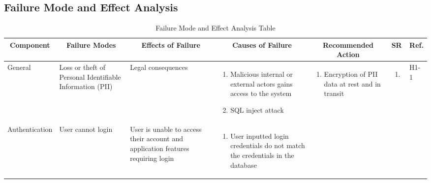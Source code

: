 \documentclass{article}
\begin{document}
\newpage
\begin{landscape}
	\section{Failure Mode and Effect Analysis}
	\begin{longtable}{|p{}|p{}|p{}|p{}|p{}|p{}|p{}|}
		\caption{Failure Mode and Effect Analysis Table}                                                     \\
		\hline
		\multicolumn{1}{|c|}{\textbf{Component}}
		 & \multicolumn{1}{|c|}{\textbf{Failure Modes}}
		 & \multicolumn{1}{|c|}{\textbf{Effects of Failure}}
		 & \multicolumn{1}{|c|}{\textbf{Causes of Failure}}
		 & \multicolumn{1}{|c|}{\textbf{Recommended Action}}
		 & \multicolumn{1}{|c|}{\textbf{SR}}
		 & \multicolumn{1}{|c|}{\textbf{Ref.}}                                                               \\
		\hline
		General
		 & Loss or theft of Personal Identifiable Information (PII)
		 & Legal consequences
		 & \begin{enumerate}[label=\alph*., leftmargin=*]
			   \item Malicious internal or external actors gains access to the system
			   \item SQL inject attack
		   \end{enumerate}
		 & \begin{enumerate}[label=\alph*., leftmargin=*]
			   \item Encryption of PII data at rest and in transit
		   \end{enumerate}
		 & \begin{enumerate}[label=\alph*., leftmargin=*]
			   \item
		   \end{enumerate}
		 & H1-1                                                                                              \\
		\hline
		\multirow{2}{*}{Authentication}
		 & User cannot login
		 & User is unable to access their account and application features requiring login
		 & \begin{enumerate}[label=\alph*., leftmargin=*]
			   \item User inputted login credentials do not match the credentials in the database
		   \end{enumerate}
		 & \begin{enumerate}[label=\alph*., leftmargin=*]

\end{enumerate}
\end{longtable}
\end{landscape}
\end{document}
